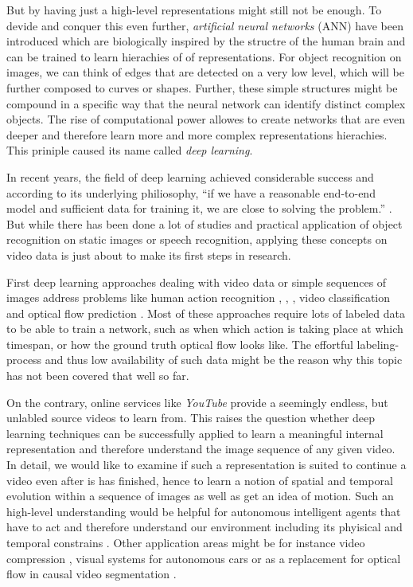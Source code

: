 But by having just a high-level representations might still not be enough. To devide and conquer this even further, \textit{artificial neural networks} (ANN) have been introduced which are biologically inspired by the structre of the human brain \parencite{ann} and can be trained to learn hierachies of of representations. For object recognition on images, we can think of edges that are detected on a very low level, which will be further composed to curves or shapes. Further, these simple structures might be compound in a specific way that the neural network can identify distinct complex objects. The rise of computational power allowes to create networks that are even deeper and therefore learn more and more complex representations hierachies. This priniple caused its name called \textit{deep learning}.

In recent years, the field of deep learning achieved considerable success and according to its underlying philiosophy, ``if we have a reasonable end-to-end model and sufficient data for training it, we are close to solving the problem.'' \parencite{conv_lstm_nowcasting}. But while there has been done a lot of studies and practical application of object recognition on static images or speech recognition, applying these concepts on video data is just about to make its first steps in research. 

First deep learning approaches dealing with video data or simple sequences of images address problems like human action recognition \parencite{conv3d_action_class}, \parencite{two_stream_action}, \parencite{longterm_rec_recog}, video classification \parencite{large_video_class} and optical flow prediction \parencite{flownet}. Most of these approaches require lots of labeled data to be able to train a network, such as when which action is taking place at which timespan, or how the ground truth optical flow looks like. The effortful labeling-process and thus low availability of such data might be the reason why this topic has not been covered that well so far.

On the contrary, online services like \textit{YouTube} provide a seemingly endless, but unlabled source videos to learn from. This raises the question whether deep learning techniques can be successfully applied to learn a meaningful internal representation and therefore understand the image sequence of any given video. In detail, we would like to examine if such a representation is suited to continue a video even after is has finished, hence to learn a notion of spatial and temporal evolution within a sequence of images as well as get an idea of motion. Such an high-level understanding would be helpful for autonomous intelligent agents that have to act and therefore understand our environment including its phyisical and temporal constrains \parencite{unsup_learn_lstm}. Other application areas might be for instance video compression \parencite{frame_interpol}, visual systems for autonomous cars or as a replacement for optical flow in causal video segmentation \parencite{causal_video_seg}.

